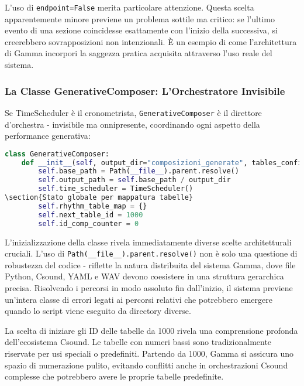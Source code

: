 L'uso di \texttt{endpoint=False} merita particolare attenzione. Questa scelta apparentemente minore previene un problema sottile ma critico: se l'ultimo evento di una sezione coincidesse esattamente con l'inizio della successiva, si creerebbero sovrapposizioni non intenzionali. È un esempio di come l'architettura di Gamma incorpori la saggezza pratica acquisita attraverso l'uso reale del sistema.
\subsubsection{La Classe GenerativeComposer: L'Orchestratore Invisibile}
Se TimeScheduler è il cronometrista, \texttt{GenerativeComposer} è il direttore d'orchestra - invisibile ma onnipresente, coordinando ogni aspetto della performance generativa:

\begin{lstlisting}[language=Python]
class GenerativeComposer:
    def __init__(self, output_dir="composizioni_generate", tables_config_path="yaml/tables.yaml"):
        self.base_path = Path(__file__).parent.resolve()
        self.output_path = self.base_path / output_dir
        self.time_scheduler = TimeScheduler()
\section{Stato globale per mappatura tabelle}
        self.rhythm_table_map = {}
        self.next_table_id = 1000
        self.id_comp_counter = 0
\end{lstlisting}

L'inizializzazione della classe rivela immediatamente diverse scelte architetturali cruciali. L'uso di \texttt{Path(\_\_file\_\_).parent.resolve()} non è solo una questione di robustezza del codice - riflette la natura distribuita del sistema Gamma, dove file Python, Csound, YAML e WAV devono coesistere in una struttura gerarchica precisa. Risolvendo i percorsi in modo assoluto fin dall'inizio, il sistema previene un'intera classe di errori legati ai percorsi relativi che potrebbero emergere quando lo script viene eseguito da directory diverse.

La scelta di iniziare gli ID delle tabelle da 1000 rivela una comprensione profonda dell'ecosistema Csound. Le tabelle con numeri bassi sono tradizionalmente riservate per usi speciali o predefiniti. Partendo da 1000, Gamma si assicura uno spazio di numerazione pulito, evitando conflitti anche in orchestrazioni Csound complesse che potrebbero avere le proprie tabelle predefinite.

